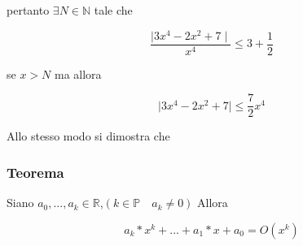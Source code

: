 \documentclass{article}
\begin{document}
        \begin{flushleft}
          pertanto $\exists N\in \mathbb{N}$ tale che
        \end{flushleft}
        \begin{equation*}
          \frac{\mid 3x^4-2x^2+7 \mid}{x^4} \leq 3+\frac{1}{2}
        \end{equation*}
        \begin{flushleft}
          se $x>N$ ma allora
        \end{flushleft}
        \begin{equation*}
          \mid 3x^4-2x^2+7 \mid  \leq \frac{7}{2} x^4
        \end{equation*}
        \begin{flushleft}
          Allo stesso modo si dimostra che 
        \end{flushleft}
        \subsubsection{Teorema}
        \begin{flushleft}
          Siano $a_0,...,a_k \in \mathbb{R}$,$(k\in \mathbb{P} \quad a_k \neq 0)$ Allora
        \end{flushleft}
        \begin{equation*}
          a_k*x^k+...+a_1*x+a_0=O(x^k)
        \end{equation*}
\end{document}
